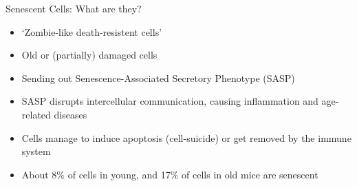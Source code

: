 \begin{frame}[c]{Senescent Cells: What are they?}
    \large
    \begin{itemize}[<+(1)->]
        \item `Zombie-like death-resistent cells'
        \item Old or (partially) damaged cells
        \item Sending out Senescence-Associated Secretory Phenotype (SASP)
        \item SASP disrupts intercellular communication, causing inflammation and age-related diseases
        \item Cells manage to induce apoptosis (cell-suicide) or get removed by the immune system
        \item About 8\% of cells in young, and 17\% of cells in old mice are senescent \cite{folgueras2018mouse}
    \end{itemize}
\end{frame}




